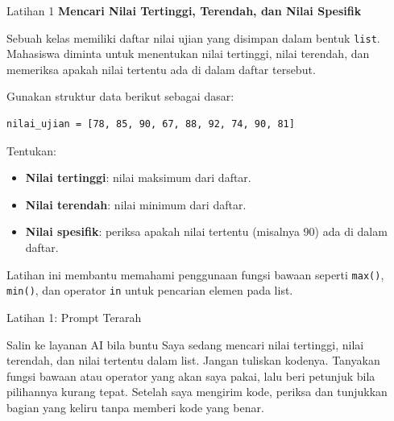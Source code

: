 \documentclass[aspectratio=169, table]{beamer}
\begin{document}
\begin{frame}[fragile,allowframebreaks=0.8]{Latihan 1}
\footnotesize
\textbf{Mencari Nilai Tertinggi, Terendah, dan Nilai Spesifik}\par\medskip
Sebuah kelas memiliki daftar nilai ujian yang disimpan dalam bentuk \texttt{list}. 
Mahasiswa diminta untuk menentukan nilai tertinggi, nilai terendah, 
dan memeriksa apakah nilai tertentu ada di dalam daftar tersebut.  

Gunakan struktur data berikut sebagai dasar:

\begin{lstlisting}[style=PythonStyle, breaklines=true]
nilai_ujian = [78, 85, 90, 67, 88, 92, 74, 90, 81]
\end{lstlisting}

Tentukan:
\begin{itemize}
  \item \textbf{Nilai tertinggi}: nilai maksimum dari daftar.
  \item \textbf{Nilai terendah}: nilai minimum dari daftar.
  \item \textbf{Nilai spesifik}: periksa apakah nilai tertentu (misalnya 90) ada di dalam daftar.
\end{itemize}


Latihan ini membantu memahami penggunaan fungsi bawaan seperti 
\texttt{max()}, \texttt{min()}, dan operator \texttt{in} untuk pencarian elemen pada list.

\end{frame}

\begin{frame}{Latihan 1: Prompt Terarah}
\begin{block}{Salin ke layanan AI bila buntu}
\small Saya sedang mencari nilai tertinggi, nilai terendah, dan nilai tertentu dalam list. Jangan tuliskan kodenya. Tanyakan fungsi bawaan atau operator yang akan saya pakai, lalu beri petunjuk bila pilihannya kurang tepat. Setelah saya mengirim kode, periksa dan tunjukkan bagian yang keliru tanpa memberi kode yang benar.
\end{block}
\end{frame}
\end{document}
